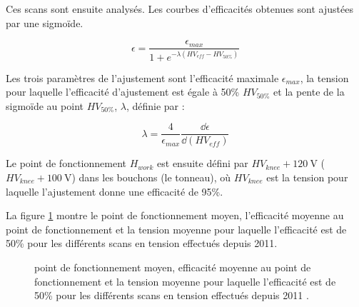 Ces scans sont ensuite analysés. Les courbes d'efficacités obtenues sont ajustées par une sigmoïde.

\begin{equation}
\epsilon=\frac{\epsilon_{max}}{1+e^{-\lambda\left(HV_{eff}-HV_{50\%}\right)}}
\end{equation}

Les trois paramètres de l'ajustement sont l'efficacité maximale $\epsilon_{max}$, la tension pour laquelle l'efficacité d'ajustement est égale à \num{50}\% $HV_{50\%}$ et la pente de la sigmoïde au point $HV_{50\%}$, $\lambda$, définie par :

\begin{equation}
\lambda=\frac{4}{\epsilon_{max}}\frac{\dd \epsilon}{\dd \left(HV_{eff}\right)}
\end{equation}

Le point de fonctionnement $H_{work}$ est ensuite défini par $HV_{knee}+\SI{120}{\volt}$ ($HV_{knee}+\SI{100}{\volt}$) dans les bouchons (le tonneau), où $HV_{knee}$ est la tension pour laquelle l'ajustement donne une efficacité de \num{95}\%.

La figure \ref{working} montre le point de fonctionnement moyen, l'efficacité moyenne au point de fonctionnement et la tension moyenne pour laquelle l'efficacité est de \num{50}\% pour les différents scans en tension effectués depuis \num{2011}.
\vspace{0.5cm}
\begin{figure}[ht!]
	\centering
	\hfill
	\caption{point de fonctionnement moyen, efficacité moyenne au point de fonctionnement et la tension moyenne pour laquelle l'efficacité est de \num{50}\% pour les différents scans en tension effectués depuis \num{2011} \cite{working2}.}
	\label{working}
\end{figure}
\newpage
